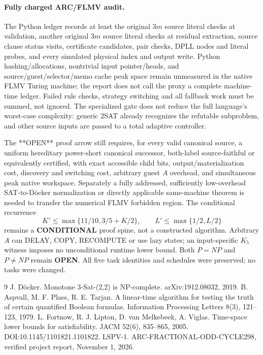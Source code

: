 \documentclass[11pt]{article}
\begin{document}
\paragraph{Fully charged ARC/FLMV audit.} The Python ledger records at least the original 3$m$ source literal checks at validation, another original 3$m$ source literal checks at residual extraction, source clause status visits, certificate candidates, pair checks, DPLL nodes and literal probes, and every simulated physical index and output write. Python hashing/allocations, nontrivial input pointer/heads, and source/guest/selector/memo cache peak space remain unmeasured in the native FLMV Turing machine; the report does not call the proxy a complete machine-time ledger. Failed rule checks, strategy switching and all fallback work must be summed, not ignored. The specialized gate does not reduce the full language's worst-case complexity: generic 2SAT already recognizes the refutable subproblem, and other source inputs are passed to a total adaptive controller.

The **OPEN** proof arrow still requires, for every valid canonical source, a uniform hereditary power-short canonical successor, both-label source-faithful or equivalently certified, with exact accessible child bits, output/materialization cost, discovery and switching cost, arbitrary guest $A$ overhead, and simultaneous peak native workspace. Separately a fully addressed, sufficiently low-overhead SAT-to-D\"ocker normalization or directly applicable same-machine theorem is needed to transfer the numerical FLMV forbidden region. The conditional recurrence
\[
 K'\le\max\{11/10,3/5+K/2\},\qquad L'\le\max\{1/2,L/2\}
\]
remains a \textbf{CONDITIONAL} proof spine, not a constructed algorithm. Arbitrary $A$ can DELAY, COPY, RECOMPUTE or use lazy states; an input-specific $K_5$ witness imposes no unconditional runtime lower bound. Both $P=NP$ and $P\neq NP$ remain \textbf{OPEN}. All five task identities and schedules were preserved; no tasks were changed.

\begin{thebibliography}{9}
 J. D\"ocker. Monotone 3-Sat-(2,2) is NP-complete. arXiv:1912.08032, 2019.
 B. Aspvall, M. F. Plass, R. E. Tarjan. A linear-time algorithm for testing the truth of certain quantified Boolean formulas. Information Processing Letters 8(3), 121--123, 1979.
 L. Fortnow, R. J. Lipton, D. van Melkebeek, A. Viglas. Time-space lower bounds for satisfiability. JACM 52(6), 835--865, 2005. DOI:10.1145/1101821.1101822.
 LSPV-1. ARC-FRACTIONAL-ODD-CYCLE298, verified project report, November 1, 2026.
\end{thebibliography}
\end{document}
